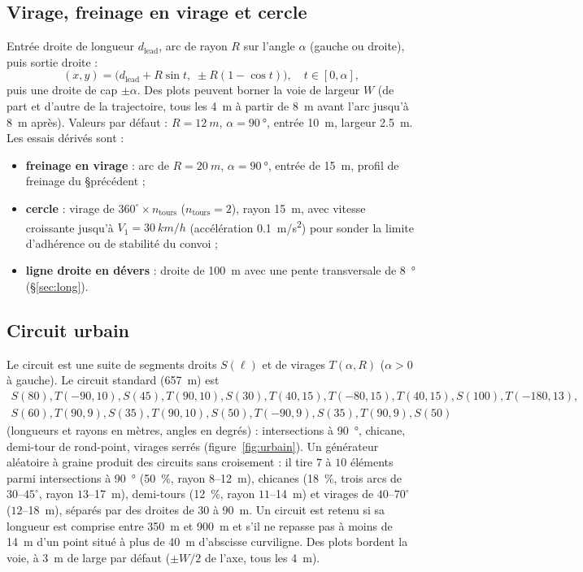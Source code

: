\documentclass[11pt,a4paper]{article}
\begin{document}
\subsection{Virage, freinage en virage et cercle}
Entrée droite de longueur $d_{\text{lead}}$, arc de rayon $R$ sur l'angle $\alpha$ (gauche ou droite), puis sortie droite :
\begin{equation}
 (x,y)=\big(d_{\text{lead}}+R\sin t,\;\pm R(1-\cos t)\big),\quad t\in[0,\alpha],
\end{equation}
puis une droite de cap $\pm\alpha$. Des plots peuvent borner la voie de largeur $W$ (de part et d'autre de la trajectoire, tous les \SI{4}{m} à partir de \SI{8}{m} avant l'arc jusqu'à \SI{8}{m} après). Valeurs par défaut : $R=\SI{12}{m}$, $\alpha=\SI{90}{\degree}$, entrée \SI{10}{m}, largeur \SI{2,5}{m}. Les essais dérivés sont :
\begin{itemize}
 \item \textbf{freinage en virage} : arc de $R=\SI{20}{m}$, $\alpha=\SI{90}{\degree}$, entrée de \SI{15}{m}, profil de freinage du §précédent ;
 \item \textbf{cercle} : virage de $360^\circ\times n_{\text{tours}}$ ($n_{\text{tours}}=2$), rayon \SI{15}{m}, avec vitesse croissante jusqu'à $V_1=\SI{30}{km/h}$ (accélération \SI{0,1}{m/s^2}) pour sonder la limite d'adhérence ou de stabilité du convoi ;
 \item \textbf{ligne droite en dévers} : droite de \SI{100}{m} avec une pente transversale de \SI{8}{\degree} (§\ref{sec:long}).
\end{itemize}

\subsection{Circuit urbain}
Le circuit est une suite de segments droits $S(\ell)$ et de virages $T(\alpha,R)$ ($\alpha>0$ à gauche). Le circuit standard (\SI{657}{m}) est
\begin{multline*}
 S(80),T(-90,10),S(45),T(90,10),S(30),T(40,15),T(-80,15),T(40,15),S(100),T(-180,13),\\
 S(60),T(90,9),S(35),T(90,10),S(50),T(-90,9),S(35),T(90,9),S(50)
\end{multline*}
(longueurs et rayons en mètres, angles en degrés) : intersections à \SI{90}{\degree}, chicane, demi-tour de rond-point, virages serrés (figure~\ref{fig:urbain}). Un générateur aléatoire à graine produit des circuits sans croisement : il tire $7$ à $10$ éléments parmi intersections à \SI{90}{\degree} (\SI{50}{\%}, rayon $8$--\SI{12}{m}), chicanes (\SI{18}{\%}, trois arcs de $30$--$45^\circ$, rayon $13$--\SI{17}{m}), demi-tours (\SI{12}{\%}, rayon $11$--\SI{14}{m}) et virages de $40$--$70^\circ$ ($12$--\SI{18}{m}), séparés par des droites de $30$ à \SI{90}{m}. Un circuit est retenu si sa longueur est comprise entre \SI{350}{m} et \SI{900}{m} et s'il ne repasse pas à moins de \SI{14}{m} d'un point situé à plus de \SI{40}{m} d'abscisse curviligne. Des plots bordent la voie, à \SI{3}{m} de large par défaut ($\pm W/2$ de l'axe, tous les \SI{4}{m}).
\end{document}
